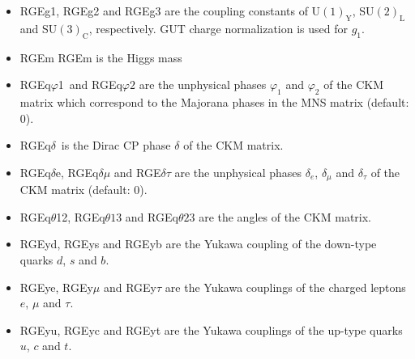 \documentclass[10pt,a4paper,twoside]{scrartcl}
\begin{document}
\begin{itemize}
\item RGEg1, RGEg2 and RGEg3 are the coupling constants of U$(1)_\mathrm{Y}$,
  SU$(2)_\mathrm{L}$ and SU$(3)_\mathrm{C}$, respectively.  GUT charge
  normalization is used for $g_1$.
  
\item RGEm RGEm is the Higgs mass
  
\item RGEq$\varphi$1\ and RGEq$\varphi2$ are the unphysical phases $\varphi_1$ and $\varphi_2$ of the
 CKM matrix which correspond to the Majorana phases in the MNS matrix (default: $0$).
\item RGEq$\delta$\ is the Dirac CP phase $\delta$ of the CKM matrix.
\item RGEq$\delta$e, RGEq$\delta\mu$ and RGE$\delta\tau$ are the unphysical phases $\delta_e$,
$\delta_\mu$ and $\delta_\tau$ of the CKM matrix (default: $0$).
\item RGEq$\theta$12, RGEq$\theta13$ and RGEq$\theta23$ are the angles of the CKM matrix. 
\item RGEyd, RGEys and RGEyb are the Yukawa coupling of the down-type quarks $d$,
  $s$ and $b$.
\item RGEye, RGEy$\mu$ and RGEy$\tau$ are the Yukawa couplings of the charged
  leptons $e$, $\mu$ and $\tau$.
\item RGEyu, RGEyc and RGEyt are the Yukawa couplings of the up-type quarks $u$,
  $c$ and $t$.

\end{itemize}
\end{document}

